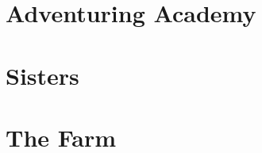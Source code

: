 

\begin{multicols}{2}

\section{Adventuring Academy}


\section{Sisters}


\section{The Farm}


\end{multicols}
